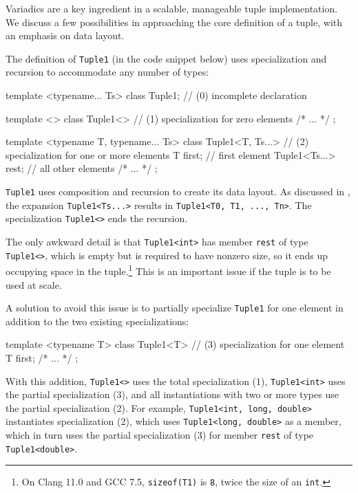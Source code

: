 \noindent Variadics are a key ingredient in a scalable, manageable tuple
implementation. We discuss a few possibilities in approaching the core
definition of a tuple, with an emphasis on data layout.

The definition of \lstinline!Tuple1! (in the code snippet below) uses
specialization and recursion to accommodate any number of types:

\begin{emcppslisting}
template <typename... Ts>
class Tuple1;                // (0) incomplete declaration

template <>
class Tuple1<>               // (1) specialization for zero elements
{ /* ... */ };

template <typename T, typename... Ts>
class Tuple1<T, Ts...>       // (2) specialization for one or more elements
{
    T first;                 // first element
    Tuple1<Ts...> rest;      // all other elements
    /* ... */
};
\end{emcppslisting}
    

\noindent \lstinline!Tuple1! uses composition and recursion to create its data
layout. As discussed in , the expansion \lstinline!Tuple1<Ts...>! results in\linebreak%
\lstinline!Tuple1<T0,!~\lstinline!T1,!~\lstinline!...,!~\lstinline!Tn>!. The
specialization \lstinline!Tuple1<>! ends the recursion.

The only awkward detail is that \lstinline!Tuple1<int>! has member
\lstinline!rest! of type \lstinline!Tuple1<>!, which is empty but is required
to have nonzero size, so it ends up occupying space in the
tuple.\footnote{On Clang 11.0 and GCC 7.5,
\lstinline!sizeof(T1)! is \lstinline!8!, twice the size of an \lstinline!int!.} This is an important issue if the
tuple is to be used at scale.

A solution to avoid this issue is to partially specialize
\lstinline!Tuple1! for one element in addition to the two existing
specializations:

\begin{emcppslisting}
template <typename T>
class Tuple1<T>               // (3) specialization for one element
{
    T first;
    /* ... */
};
\end{emcppslisting}
    

\noindent With this addition, \lstinline!Tuple1<>! uses the total specialization (1),
\lstinline!Tuple1<int>! uses the partial specialization (3), and all
instantiations with two or more types use the partial specialization
(2). For example, \lstinline!Tuple1<int,!~\lstinline!long,!~\lstinline!double>!
instantiates specialization (2), which uses
\lstinline!Tuple1<long,!~\lstinline!double>! as a member, which in turn uses
the partial specialization (3) for member \lstinline!rest! of type
\lstinline!Tuple1<double>!.

